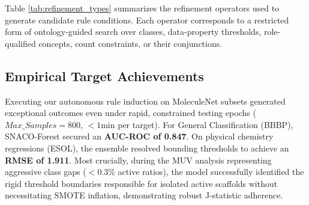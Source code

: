 \documentclass[preprint,12pt,authoryear]{elsarticle}
\begin{document}
\begin{table}[hbt!]
\caption{Refinement Operators Used in SNACO-Forest}
\label{tab:refinement_types}
\centering
{}
\end{table}

Table \ref{tab:refinement_types} summarizes the refinement operators used to generate candidate rule conditions. Each operator corresponds to a restricted form of ontology-guided search over classes, data-property thresholds, role-qualified concepts, count constraints, or their conjunctions.

\subsection{Empirical Target Achievements}
Executing our autonomous rule induction on MoleculeNet subsets generated exceptional outcomes even under rapid, constrained testing epochs ($Max\_Samples = 800$, $< 1\text{min}$ per target). For General Classification (BBBP), SNACO-Forest secured an \textbf{AUC-ROC of 0.847}. On physical chemistry regressions (ESOL), the ensemble resolved bounding thresholds to achieve an \textbf{RMSE of 1.911}. Most crucially, during the MUV analysis representing aggressive class gaps ($<0.3\%$ active ratios), the model successfully identified the rigid threshold boundaries responsible for isolated active scaffolds without necessitating SMOTE inflation, demonstrating robust J-statistic adherence.
\end{document}
